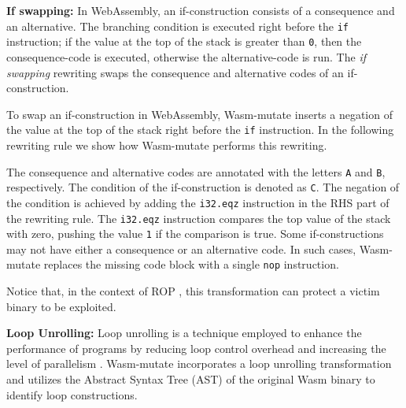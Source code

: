 \documentclass[sigplan,screen]{acmart}
\newcommand{\tool}{Wasm-mutate\xspace}
\begin{document}


\textbf{If swapping:} In WebAssembly, an if-construction consists of a consequence and an alternative. The branching condition is executed right before the \texttt{if} instruction; if the value at the top of the stack is greater than \texttt{0}, then the consequence-code is executed, otherwise the alternative-code is run.
The \emph{if swapping} rewriting swaps the consequence and alternative codes of an if-construction.


To swap an if-construction in WebAssembly, \tool inserts a negation of the value at the top of the stack right before the \texttt{if} instruction.
In the following rewriting rule we show how \tool performs this rewriting.

The consequence and alternative codes are annotated with the letters \texttt{A} and \texttt{B}, respectively.
The condition of the if-construction is denoted as \texttt{C}.
The negation of the condition is achieved by adding the \texttt{i32.eqz} instruction in the RHS part of the rewriting rule.
The \texttt{i32.eqz} instruction compares the top value of the stack with zero, pushing the value \texttt{1} if the comparison is true.
Some if-constructions may not have either a consequence or an alternative code.
In such cases, \tool replaces the missing code block with a single \texttt{nop} instruction.

Notice that, in the context of ROP \cite{Swivel}, this transformation can protect a victim binary to be exploited. 



\textbf{Loop Unrolling:} 
Loop unrolling is a technique employed to enhance the performance of programs by reducing loop control overhead and increasing the level of parallelism \cite{dongarra1979unrolling}. 
\tool incorporates a loop unrolling transformation and utilizes the Abstract Syntax Tree (AST) of the original Wasm binary to identify loop constructions. 
\end{document}

